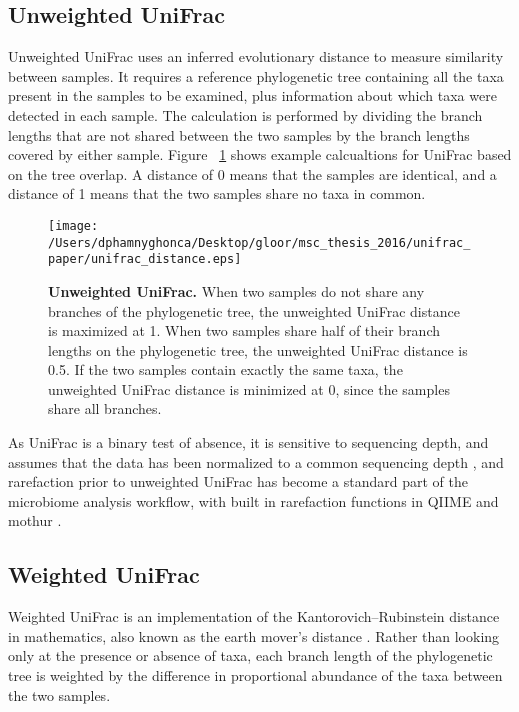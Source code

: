 \documentclass[10pt,letterpaper]{article}
\begin{document}
\subsection{Unweighted UniFrac}
Unweighted UniFrac \cite{lozupone2005unifrac} uses an inferred evolutionary distance to measure similarity between samples. It requires a reference phylogenetic tree containing all the taxa present in the samples to be examined, plus information about which taxa were detected in each sample. The calculation is performed by dividing the branch lengths that are not shared between the two samples by the branch lengths covered by either sample. Figure ~\ref{fig1} shows example calcualtions for UniFrac based on the tree overlap. A distance of 0 means that the samples are identical, and a distance of 1 means that the two samples share no taxa in common.

\begin{figure}[h]
\texttt{[image: /Users/dphamnyghonca/Desktop/gloor/msc\_thesis\_2016/unifrac\_paper/unifrac\_distance.eps]}
\caption[Unweighted UniFrac.]{{\bf Unweighted UniFrac.}
When two samples do not share any branches of the phylogenetic tree, the unweighted UniFrac distance is maximized at 1. When two samples share half of their branch lengths on the phylogenetic tree, the unweighted UniFrac distance is 0.5. If the two samples contain exactly the same taxa, the unweighted UniFrac distance is minimized at 0, since the samples share all branches.}
\label{fig1}
\end{figure}

As UniFrac is a binary test of absence, it is sensitive to sequencing depth, and assumes that the data has been normalized to a common sequencing depth \cite{lozupone2011unifrac}, and rarefaction prior to unweighted UniFrac has become a standard part of the microbiome analysis workflow, with built in rarefaction functions in QIIME \cite{caporaso2010qiime} and mothur \cite{schloss2009introducing}.

\FloatBarrier

\subsection{Weighted UniFrac}
Weighted UniFrac \cite{lozupone2007quantitative} is an implementation of the Kantorovich–Rubinstein distance in mathematics, also known as the earth mover’s distance \cite{evans2012phylogenetic}. Rather than looking only at the presence or absence of taxa, each branch length of the phylogenetic tree is weighted by the difference in proportional abundance of the taxa between the two samples.
\end{document}

